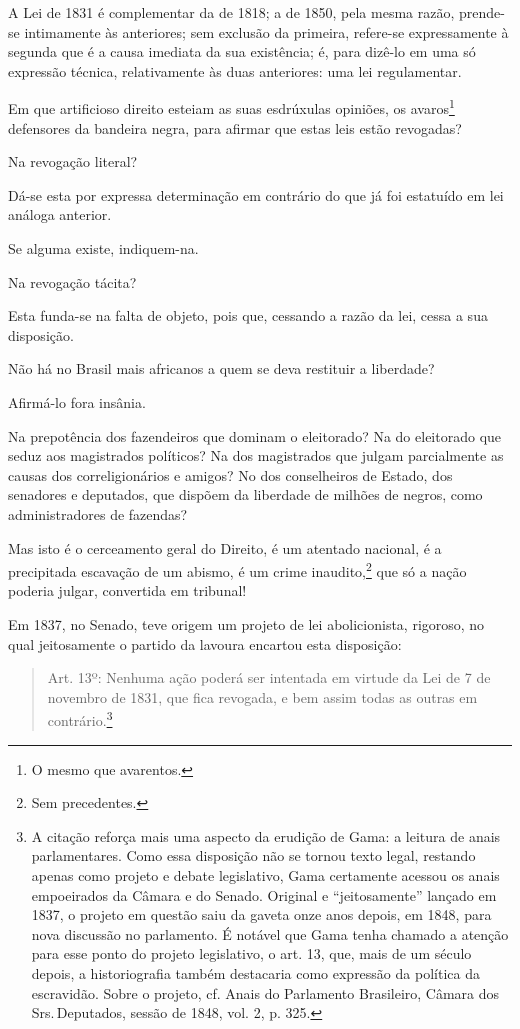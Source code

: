 A Lei de 1831 é complementar da de 1818; a de 1850, pela mesma razão,
prende-se intimamente às anteriores; sem exclusão da primeira, refere-se
expressamente à segunda que é a causa imediata da sua existência; é,
para dizê-lo em uma só expressão técnica, relativamente às duas
anteriores: uma lei regulamentar.

\asterisc

Em que artificioso direito esteiam as suas esdrúxulas opiniões, os
avaros\footnote{O mesmo que avarentos.} defensores da bandeira negra,
para afirmar que estas leis estão revogadas?

Na revogação literal?

Dá-se esta por expressa determinação em contrário do que já foi
estatuído em lei análoga anterior.

Se alguma existe, indiquem-na.

Na revogação tácita?

Esta funda-se na falta de objeto, pois que, cessando a razão da lei,
cessa a sua disposição.

Não há no Brasil mais africanos a quem se deva restituir a liberdade?

Afirmá-lo fora insânia.

Na prepotência dos fazendeiros que dominam o eleitorado? Na do
eleitorado que seduz aos magistrados políticos? Na dos magistrados que
julgam parcialmente as causas dos correligionários e amigos? No dos
conselheiros de Estado, dos senadores e deputados, que dispõem da
liberdade de milhões de negros, como administradores de fazendas?

Mas isto é o cerceamento geral do Direito, é um atentado nacional, é a
precipitada escavação de um abismo, é um crime inaudito,\footnote{Sem
  precedentes.} que só a nação poderia julgar, convertida em tribunal!

Em 1837, no Senado, teve origem um projeto de lei abolicionista,
rigoroso, no qual jeitosamente o partido da lavoura encartou esta
disposição:

\begin{quote}
Art. 13º: Nenhuma ação poderá ser intentada em virtude da Lei de 7 de
novembro de 1831, que fica revogada, e bem assim todas as outras em
contrário.\footnote{A citação reforça mais uma aspecto da erudição de
  Gama: a leitura de anais parlamentares. Como essa disposição não se
  tornou texto legal, restando apenas como projeto e debate legislativo,
  Gama certamente acessou os anais empoeirados da Câmara e do Senado.
  Original e ``jeitosamente'' lançado em 1837, o projeto em questão saiu
  da gaveta onze anos depois, em 1848, para nova discussão no
  parlamento. É notável que Gama tenha chamado a atenção para esse ponto
  do projeto legislativo, o art. 13, que, mais de um século depois, a
  historiografia também destacaria como expressão da política da
  escravidão. Sobre o projeto, cf. Anais do Parlamento Brasileiro,
  Câmara dos Srs.\,Deputados, sessão de 1848, vol. 2, p. 325.}
\end{quote}

